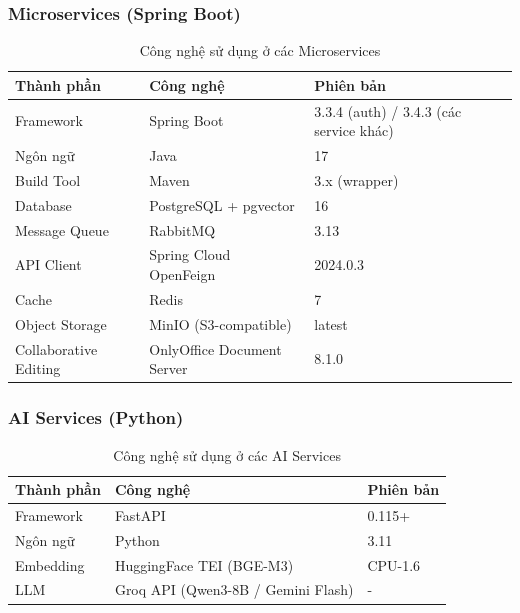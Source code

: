 \documentclass[12pt,a4paper]{report}
\begin{document}
\subsubsection{Microservices (Spring Boot)}
\begin{table}[H]
\centering
\caption{Công nghệ sử dụng ở các Microservices}
\label{tab:microservices_tech}
\begin{tabularx}{\textwidth}{|l|X|l|}
\hline
\rowcolor{gray!10}
Thành phần & Công nghệ & Phiên bản \\ \hline
Framework & Spring Boot & 3.3.4 (auth) / 3.4.3 (các service khác) \\ \hline
Ngôn ngữ & Java & 17 \\ \hline
Build Tool & Maven & 3.x (wrapper) \\ \hline
Database & PostgreSQL + pgvector & 16 \\ \hline
Message Queue & RabbitMQ & 3.13 \\ \hline
API Client & Spring Cloud OpenFeign & 2024.0.3 \\ \hline
Cache & Redis & 7 \\ \hline
Object Storage & MinIO (S3-compatible) & latest \\ \hline
Collaborative Editing & OnlyOffice Document Server & 8.1.0 \\ \hline
\end{tabularx}
\end{table}

\subsubsection{AI Services (Python)}
\begin{table}[H]
\centering
\caption{Công nghệ sử dụng ở các AI Services}
\label{tab:ai_services_tech}
\begin{tabularx}{\textwidth}{|l|X|l|}
\hline
\rowcolor{gray!10}
Thành phần & Công nghệ & Phiên bản \\ \hline
Framework & FastAPI & 0.115+ \\ \hline
Ngôn ngữ & Python & 3.11 \\ \hline
Embedding & HuggingFace TEI (BGE-M3) & CPU-1.6 \\ \hline
LLM & Groq API (Qwen3-8B / Gemini Flash) & - \\ \hline
\end{tabularx}
\end{table}
\end{document}
